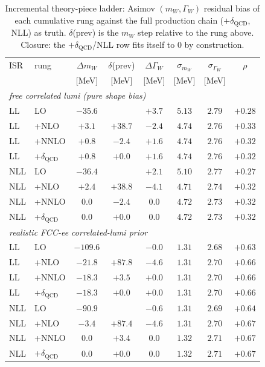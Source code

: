 \documentclass[11pt,a4paper]{article}
\newcommand{\mW}{m_W}
\newcommand{\GammaW}{\Gamma_W}
\begin{document}
\begin{table}[h]
\centering
\caption{Incremental theory-piece ladder: Asimov $(\mW,\GammaW)$
residual bias of each cumulative rung against the full production chain
($+\delta_\text{QCD}$, NLL) as truth. $\delta$(prev) is the $\mW$ step
relative to the rung above. Closure: the $+\delta_\text{QCD}$/NLL row
fits itself to $0$ by construction.}
\label{tab:theory-ladder}
\begin{tabular}{l l c c c c c c}
\toprule
ISR & rung & $\Delta\mW$ & $\delta$(prev) & $\Delta\GammaW$ & $\sigma_{\mW}$ & $\sigma_{\GammaW}$ & $\rho$ \\
 & & [MeV] & [MeV] & [MeV] & [MeV] & [MeV] & \\
\midrule
\multicolumn{8}{l}{\emph{free correlated lumi (pure shape bias)}}\\
LL  & LO                   & $-35.6$ &        & $+3.7$ & $5.13$ & $2.79$ & $+0.28$ \\
LL  & +NLO                 & $+3.1$  & $+38.7$ & $-2.4$ & $4.74$ & $2.76$ & $+0.33$ \\
LL  & +NNLO                & $+0.8$  & $-2.4$ & $+1.6$ & $4.74$ & $2.76$ & $+0.32$ \\
LL  & +$\delta_\text{QCD}$ & $+0.8$  & $+0.0$ & $+1.6$ & $4.74$ & $2.76$ & $+0.32$ \\
NLL & LO                   & $-36.4$ &        & $+2.1$ & $5.10$ & $2.77$ & $+0.27$ \\
NLL & +NLO                 & $+2.4$  & $+38.8$ & $-4.1$ & $4.71$ & $2.74$ & $+0.32$ \\
NLL & +NNLO                & $0.0$   & $-2.4$ & $0.0$  & $4.72$ & $2.73$ & $+0.32$ \\
NLL & +$\delta_\text{QCD}$ & $0.0$   & $+0.0$ & $0.0$  & $4.72$ & $2.73$ & $+0.32$ \\
\midrule
\multicolumn{8}{l}{\emph{realistic FCC-ee correlated-lumi prior}}\\
LL  & LO                   & $-109.6$ &        & $-0.0$ & $1.31$ & $2.68$ & $+0.63$ \\
LL  & +NLO                 & $-21.8$ & $+87.8$ & $-4.6$ & $1.31$ & $2.70$ & $+0.66$ \\
LL  & +NNLO                & $-18.3$ & $+3.5$ & $+0.0$ & $1.31$ & $2.70$ & $+0.66$ \\
LL  & +$\delta_\text{QCD}$ & $-18.3$ & $+0.0$ & $+0.0$ & $1.31$ & $2.70$ & $+0.66$ \\
NLL & LO                   & $-90.9$ &        & $-0.6$ & $1.31$ & $2.69$ & $+0.64$ \\
NLL & +NLO                 & $-3.4$  & $+87.4$ & $-4.6$ & $1.31$ & $2.70$ & $+0.67$ \\
NLL & +NNLO                & $0.0$   & $+3.4$ & $0.0$  & $1.32$ & $2.71$ & $+0.67$ \\
NLL & +$\delta_\text{QCD}$ & $0.0$   & $+0.0$ & $0.0$  & $1.32$ & $2.71$ & $+0.67$ \\
\bottomrule
\end{tabular}
\end{table}
\end{document}
